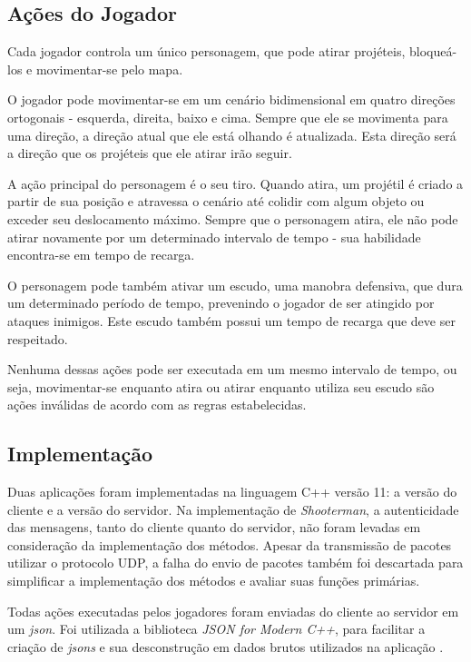 \subsection{Ações do Jogador}

Cada jogador controla um único personagem, que pode atirar projéteis, bloqueá-los e movimentar-se pelo mapa.

O jogador pode movimentar-se em um cenário bidimensional em quatro direções ortogonais - esquerda, direita, baixo e cima. Sempre que ele se movimenta para uma direção, a direção atual que ele está olhando é atualizada. Esta direção será a direção que os projéteis que ele atirar irão seguir.

 A ação principal do personagem é o seu tiro. Quando atira, um projétil é criado a partir de sua posição e atravessa o cenário até colidir com algum objeto ou exceder seu deslocamento máximo. Sempre que o personagem atira, ele não pode atirar novamente por um determinado intervalo de tempo - sua habilidade encontra-se em tempo de recarga.

 O personagem pode também ativar um escudo, uma manobra defensiva, que dura um determinado período de tempo, prevenindo o jogador de ser atingido por ataques inimigos. Este escudo também possui um tempo de recarga que deve ser respeitado.

 Nenhuma dessas ações pode ser executada em um mesmo intervalo de tempo, ou seja, movimentar-se enquanto atira ou atirar enquanto utiliza seu escudo são ações inválidas de acordo com as regras estabelecidas.  



\subsection{Implementação}

Duas aplicações foram implementadas na linguagem C++ versão 11: a versão do cliente e a versão do servidor. Na implementação de \textit{Shooterman}, a autenticidade das mensagens, tanto do cliente quanto do servidor, não foram levadas em consideração da implementação dos métodos. Apesar da transmissão de pacotes utilizar o protocolo UDP, a falha do envio de pacotes também foi descartada para simplificar a implementação dos métodos e avaliar suas funções primárias.


Todas ações executadas pelos jogadores foram enviadas do cliente ao servidor em um \textit{json}. Foi utilizada a biblioteca \textit{JSON for Modern C++}, para facilitar a criação de \textit{jsons} e sua desconstrução em dados brutos utilizados na aplicação \cite{json}. 

